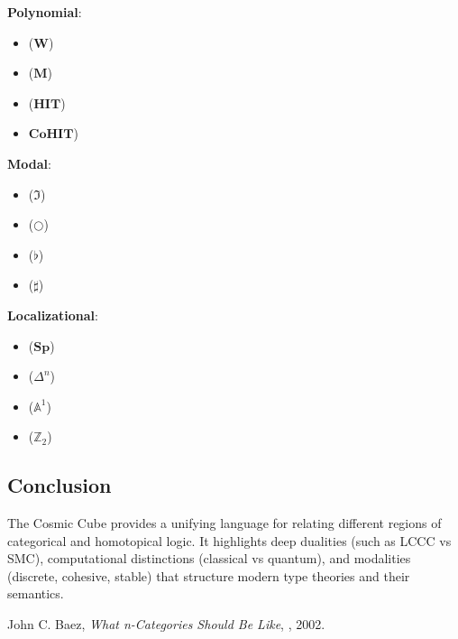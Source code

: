 \documentclass{article}
\begin{document}
\noindent \textbf{Polynomial}:
\begin{itemize}
\item {} ($\mathbf{W}$)
\item {} ($\mathbf{M}$)
\item {} ($\mathbf{HIT}$)
\item {} $\mathbf{CoHIT}$)
\end{itemize}

\noindent \textbf{Modal}:
\begin{itemize}
\item {} ($\Im$)
\item {} ($\bigcirc$)
\item {} ($\flat$)
\item {} ($\sharp$)
\end{itemize}

\noindent \textbf{Localizational}:
\begin{itemize}
\item {} ($\mathbf{Sp}$)
\item {} ($\mathbb{\Delta}^n$)
\item {} ($\mathbb{A}^1$)
\item {} ($\mathbb{Z}_2$)
\end{itemize}

\subsection{Conclusion}
The Cosmic Cube provides a unifying language for relating different regions
of categorical and homotopical logic. It highlights deep dualities (such as
LCCC vs SMC), computational distinctions (classical vs quantum),
and modalities (discrete, cohesive, stable) that structure modern
type theories and their semantics.

\begin{thebibliography}{9}
 John C. Baez, \emph{What n-Categories Should Be Like}, , 2002.
\end{thebibliography}
\end{document}
